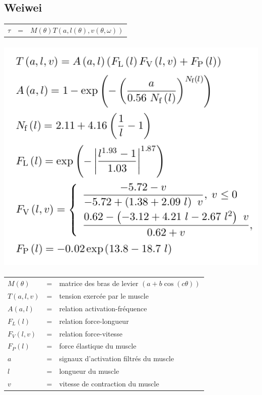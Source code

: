 \documentclass[pdftex,a4paper,11pt]{article}
\begin{document}

\subsection{Weiwei}

\begin{tabular}{lcl}
    $\tau$ & = & $M(\theta) T(a, l(\theta), v(\theta, \omega))$ \\
\end{tabular}

\paragraph{}
\begin{center}
        \includegraphics[width=.60\linewidth]{fig/weiwei}
\end{center}

\paragraph{}
\begin{tabular}{lcl}
    $M(\theta)$  & = & matrice des bras de levier $(a + b \cos (c \theta))$ \\
    $T(a, l, v)$ & = & tension exercée par le muscle \\
    $A(a, l)$    & = & relation activation-fréquence \\
    $F_L(l)$     & = & relation force-longueur \\
    $F_V(l, v)$  & = & relation force-vitesse \\
    $F_P(l)$     & = & force élastique du muscle \\ %
    $a$          & = & signaux d'activation filtrés du muscle \\
    $l$          & = & longueur du muscle \\
    $v$          & = & vitesse de contraction du muscle \\
\end{tabular}
\end{document}
